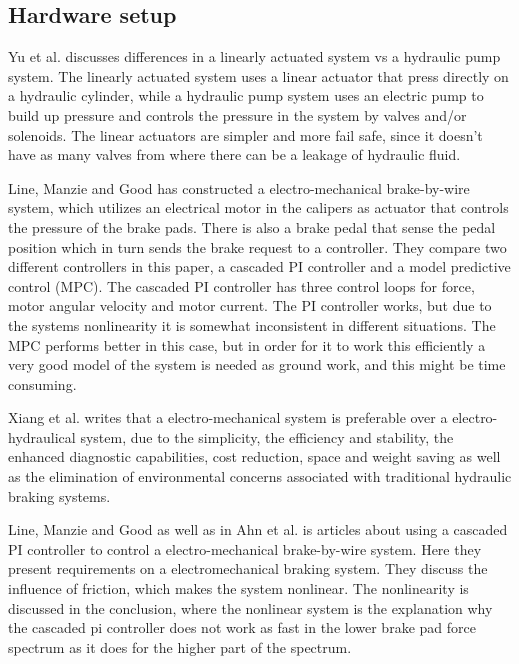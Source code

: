 \documentclass[a4paper,11pt]{kth-mag}
\begin{document}
\subsection*{Hardware setup}
Yu et al. \cite{Yu} discusses differences in a linearly actuated system vs a hydraulic pump system. The linearly actuated system uses a linear actuator that press directly on a hydraulic cylinder, while a hydraulic pump system uses an electric pump to build up pressure and controls the pressure in the system by valves and/or solenoids. The linear actuators are simpler and more fail safe, since it doesn't have as many valves from where there can be a leakage of hydraulic fluid. 


\vspace{5mm}
Line, Manzie and Good \cite{4475522} has constructed a electro-mechanical  brake-by-wire system, which utilizes an electrical motor in the calipers as actuator that controls the pressure of the brake pads. There is also a brake pedal that sense the pedal position which in turn sends the brake request to a controller. They compare two different controllers in this paper, a cascaded PI controller and a model predictive control (MPC). The cascaded PI controller has three control loops for force, motor angular velocity and motor current. The PI controller works, but due to the systems nonlinearity it is somewhat inconsistent in different situations. The MPC performs better in this case, but in order for it to work this efficiently a very good model of the system is needed as ground work, and this might be time consuming. \newline


Xiang et al. \cite{Xiang} writes that a electro-mechanical system is preferable over a electro-hydraulical system, due to the simplicity, the efficiency and stability, the enhanced diagnostic capabilities, cost reduction, space and weight saving as well as the elimination of environmental concerns associated with traditional hydraulic braking systems.\newline

Line, Manzie and Good \cite{2004-01-2050} as well as in Ahn et al. \cite{ahn2009analysis} is articles about using a cascaded PI controller to control a electro-mechanical brake-by-wire system. Here they present requirements on a electromechanical braking system. They discuss the influence of friction, which makes the system nonlinear. The nonlinearity is discussed in the conclusion, where the nonlinear system is the explanation why the cascaded pi controller does not work as fast in the lower brake pad force spectrum as it does for the higher part of the spectrum. \newline
\end{document}
